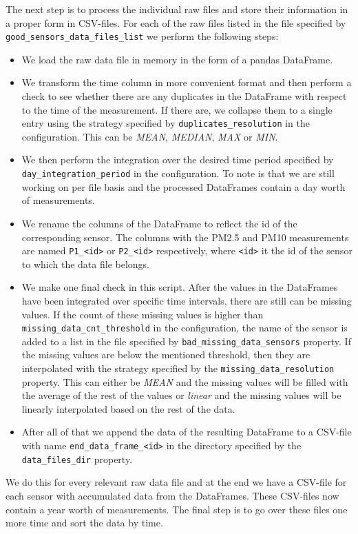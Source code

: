 \documentclass[12pt,a4paper,twoside]{scrartcl}
\numberwithin{equation}{section}
\begin{document}
The next step is to process the individual raw files and store their information in a proper form in CSV-files. For each of the raw files listed in the file specified by \texttt{good\_sensors\_data\_files\_list} we perform the following steps:
\begin{itemize}
\item We load the raw data file in memory in the form of a pandas DataFrame.
\item We transform the time column in more convenient format and then perform a check to see whether there are any duplicates in the DataFrame with respect to the time of the measurement. If there are, we collapse them to a single entry using the strategy specified by \texttt{duplicates\_resolution} in the configuration. This can be \emph{MEAN}, \emph{MEDIAN}, \emph{MAX} or \emph{MIN}. 
\item We then perform the integration over the desired time period specified by \texttt{day\_integration\_period} in the configuration. To note is that we are still working on per file basis and the processed DataFrames contain a day worth of measurements.
\item We rename the columns of the DataFrame to reflect the id of the corresponding sensor. The columns with the PM2.5 and PM10 measurements are named \texttt{P1\_<id>} or \texttt{P2\_<id>} respectively, where \texttt{<id>} it the id of the sensor to which the data file belongs.
\item We make one final check in this script. After the values in the DataFrames have been integrated over specific time intervals, there are still can be missing values. If the count of these missing values is higher than \texttt{missing\_data\_cnt\_threshold} in the configuration, the name of the sensor is added to a list in the file specified by \texttt{bad\_missing\_data\_sensors} property. If the missing values are below the mentioned threshold, then they are interpolated with the strategy specified by the \texttt{missing\_data\_resolution} property. This can either be \emph{MEAN} and the missing values will be filled with the average of the rest of the values or \emph{linear} and the missing values will be linearly interpolated based on the rest of the data.
\item After all of that we append the data of the resulting DataFrame to a CSV-file with name \texttt{end\_data\_frame\_<id>} in the directory specified by the \texttt{data\_files\_dir} property.
\end{itemize}
We do this for every relevant raw data file and at the end we have a CSV-file for each sensor with accumulated data from the DataFrames. These CSV-files now contain a year worth of measurements. The final step is to go over these files one more time and sort the data by time.
\end{document}
